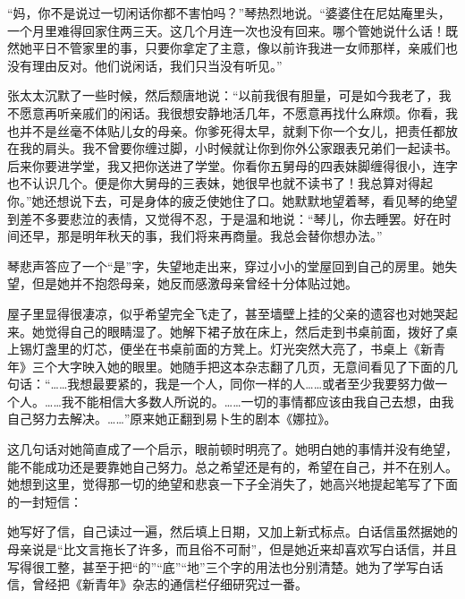 \par “妈，你不是说过一切闲话你都不害怕吗？”琴热烈地说。“婆婆住在尼姑庵里头，一个月里难得回家住两三天。这几个月连一次也没有回来。哪个管她说什么话！既然她平日不管家里的事，只要你拿定了主意，像以前许我进一女师那样，亲戚们也没有理由反对。他们说闲话，我们只当没有听见。”
\par 张太太沉默了一些时候，然后颓唐地说：“以前我很有胆量，可是如今我老了，我不愿意再听亲戚们的闲话。我很想安静地活几年，不愿意再找什么麻烦。你看，我也并不是丝毫不体贴儿女的母亲。你爹死得太早，就剩下你一个女儿，把责任都放在我的肩头。我不曾要你缠过脚，小时候就让你到你外公家跟表兄弟们一起读书。后来你要进学堂，我又把你送进了学堂。你看你五舅母的四表妹脚缠得很小，连字也不认识几个。便是你大舅母的三表妹，她很早也就不读书了！我总算对得起你。”她还想说下去，可是身体的疲乏使她住了口。她默默地望着琴，看见琴的绝望到差不多要悲泣的表情，又觉得不忍，于是温和地说：“琴儿，你去睡罢。好在时间还早，那是明年秋天的事，我们将来再商量。我总会替你想办法。”
\par 琴悲声答应了一个“是”字，失望地走出来，穿过小小的堂屋回到自己的房里。她失望，但是她并不抱怨母亲，她反而感激母亲曾经十分体贴过她。
\par 屋子里显得很凄凉，似乎希望完全飞走了，甚至墙壁上挂的父亲的遗容也对她哭起来。她觉得自己的眼睛湿了。她解下裙子放在床上，然后走到书桌前面，拨好了桌上锡灯盏里的灯芯，便坐在书桌前面的方凳上。灯光突然大亮了，书桌上《新青年》三个大字映入她的眼里。她随手把这本杂志翻了几页，无意间看见了下面的几句话：“……我想最要紧的，我是一个人，同你一样的人……或者至少我要努力做一个人。……我不能相信大多数人所说的。……一切的事情都应该由我自己去想，由我自己努力去解决。……”原来她正翻到易卜生的剧本《娜拉》。
\par 这几句话对她简直成了一个启示，眼前顿时明亮了。她明白她的事情并没有绝望，能不能成功还是要靠她自己努力。总之希望还是有的，希望在自己，并不在别人。她想到这里，觉得那一切的绝望和悲哀一下子全消失了，她高兴地提起笔写了下面的一封短信：
\par 她写好了信，自己读过一遍，然后填上日期，又加上新式标点。白话信虽然据她的母亲说是“比文言拖长了许多，而且俗不可耐”，但是她近来却喜欢写白话信，并且写得很工整，甚至于把“的”“底”“地”三个字的用法也分别清楚。她为了学写白话信，曾经把《新青年》杂志的通信栏仔细研究过一番。


